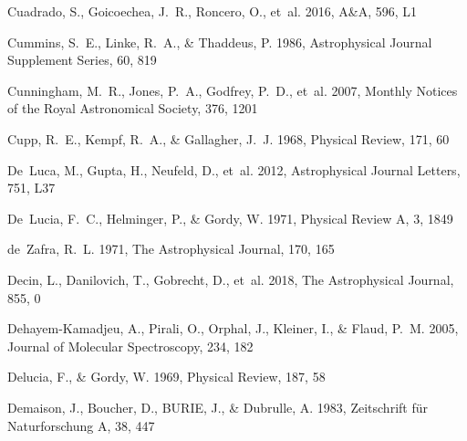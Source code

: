 \documentclass[twocolumn]{aastex631}
\begin{document}
\begin{thebibliography}{}
Cuadrado, S., Goicoechea, J.~R., Roncero, O., {et~al.} 2016, A{\&}A, 596, L1

Cummins, S.~E., Linke, R.~A., \& Thaddeus, P. 1986, Astrophysical Journal
  Supplement Series, 60, 819

Cunningham, M.~R., Jones, P.~A., Godfrey, P.~D., {et~al.} 2007, Monthly Notices
  of the Royal Astronomical Society, 376, 1201

Cupp, R.~E., Kempf, R.~A., \& Gallagher, J.~J. 1968, Physical Review, 171, 60

De~Luca, M., Gupta, H., Neufeld, D., {et~al.} 2012, Astrophysical Journal
  Letters, 751, L37

De~Lucia, F.~C., Helminger, P., \& Gordy, W. 1971, Physical Review A, 3, 1849

de~Zafra, R.~L. 1971, The Astrophysical Journal, 170, 165

Decin, L., Danilovich, T., Gobrecht, D., {et~al.} 2018, The Astrophysical
  Journal, 855, 0

Dehayem-Kamadjeu, A., Pirali, O., Orphal, J., Kleiner, I., \& Flaud, P.~M.
  2005, Journal of Molecular Spectroscopy, 234, 182

Delucia, F., \& Gordy, W. 1969, Physical Review, 187, 58

Demaison, J., Boucher, D., BURIE, J., \& Dubrulle, A. 1983, Zeitschrift f{\"u}r
  Naturforschung A, 38, 447


\end{thebibliography}
\end{document}
